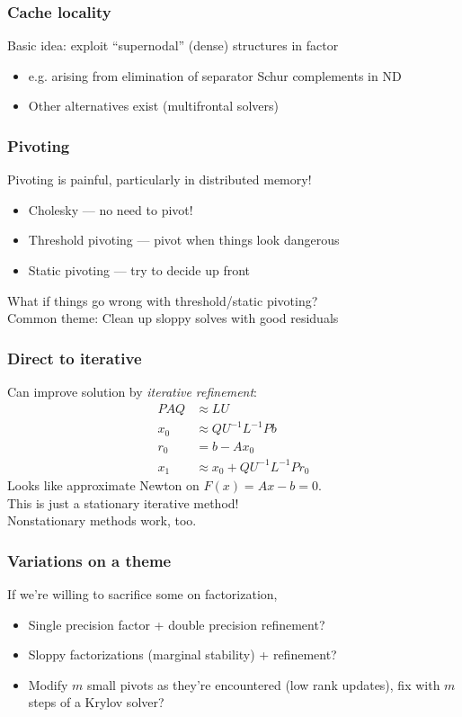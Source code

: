 \documentclass{beamer}
\begin{document}
\begin{frame}
  \frametitle{Cache locality}

  Basic idea: exploit ``supernodal'' (dense) structures in factor
  \begin{itemize}
  \item e.g. arising from elimination of separator Schur complements in ND
  \item Other alternatives exist (multifrontal solvers)
  \end{itemize}
\end{frame}


\begin{frame}
  \frametitle{Pivoting}

  Pivoting is painful, particularly in distributed memory!
  \begin{itemize}
  \item Cholesky --- no need to pivot!
  \item Threshold pivoting --- pivot when things look dangerous
  \item Static pivoting --- try to decide up front
  \end{itemize}
  What if things go wrong with threshold/static pivoting? \\
  Common theme: Clean up sloppy solves with good residuals

\end{frame}


\begin{frame}
  \frametitle{Direct to iterative}

  Can improve solution by {\em iterative refinement}:
  \begin{align*}
  PAQ &\approx LU \\
  x_0 &\approx Q U^{-1} L^{-1} Pb \\
  r_0 &= b-Ax_0 \\
  x_1 &\approx x_0 + Q U^{-1} L^{-1} P r_0
  \end{align*}
  Looks like approximate Newton on $F(x) = Ax-b = 0$. \\
  This is just a stationary iterative method! \\
  Nonstationary methods work, too.

\end{frame}


\begin{frame}
  \frametitle{Variations on a theme}

  If we're willing to sacrifice some on factorization,
  \begin{itemize}
  \item Single precision factor + double precision refinement?
  \item Sloppy factorizations (marginal stability) + refinement?
  \item Modify $m$ small pivots as they're encountered (low rank updates),
    fix with $m$ steps of a Krylov solver?
  \end{itemize}
\end{frame}

 
\end{document}
